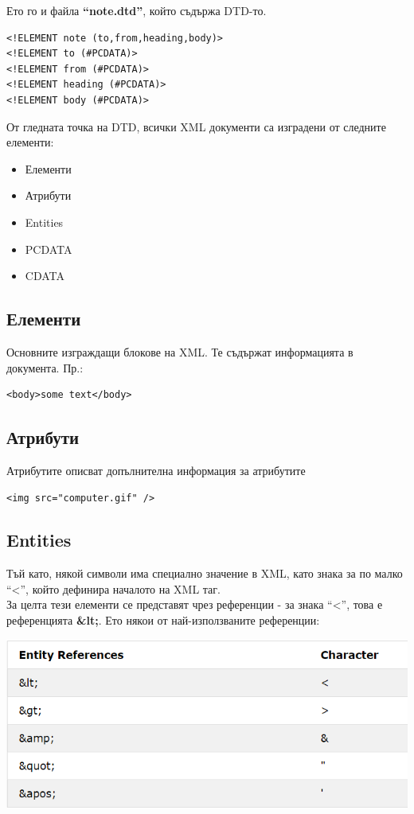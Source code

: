 \documentclass[11pt]{article} %
\begin{document}
Ето го и файла \textbf{\enquote{note.dtd}}, който съдържа DTD-то.
\begin{verbatim}
<!ELEMENT note (to,from,heading,body)>
<!ELEMENT to (#PCDATA)>
<!ELEMENT from (#PCDATA)>
<!ELEMENT heading (#PCDATA)>
<!ELEMENT body (#PCDATA)>
\end{verbatim}

От гледната точка на DTD, всички XML документи са изградени от следните елементи:
\begin{itemize}[noitemsep]
	\item Елементи
	\item Атрибути
	\item Entities
	\item PCDATA
	\item CDATA
\end{itemize}

\subsection{Елементи}
Основните изграждащи блокове на XML. Те съдържат информацията в документа. Пр.: 
\begin{verbatim}
<body>some text</body>
\end{verbatim}

\subsection{Атрибути}
Атрибутите описват допълнителна информация за атрибутите
\begin{verbatim}
<img src="computer.gif" />
\end{verbatim}

\subsection{Entities}
Тъй като, някой символи има специално значение в XML, като знака за по малко \enquote{<}, който дефинира началото на XML таг.\\
За целта тези елементи се представят чрез референции - за знака \enquote{<}, това е референцията \textbf{\&lt;}. Ето някои от най-използваните референции:\\
\begin{center}
	\includegraphics[scale=0.75]{references.png}
\end{center}
\end{document}
